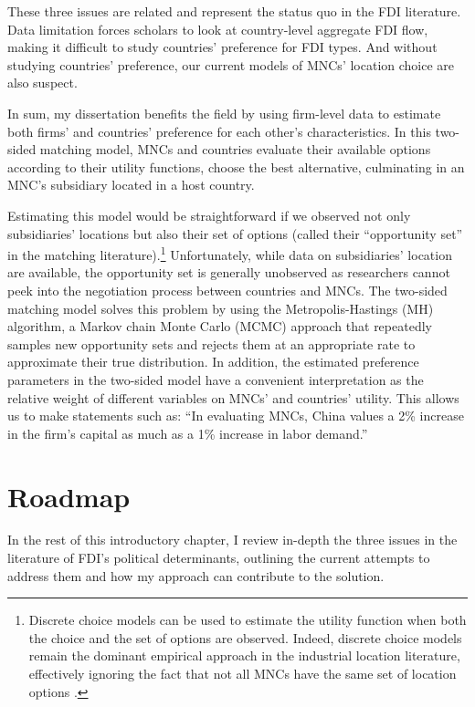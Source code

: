 These three issues are related and represent the status quo in the FDI
literature. Data limitation forces scholars to look at country-level aggregate
FDI flow, making it difficult to study countries' preference for FDI types. And
without studying countries' preference, our current models of MNCs' location
choice are also suspect.

In sum, my dissertation benefits the field by using firm-level data to estimate
both firms' and countries' preference for each other's characteristics. In this
two-sided matching model, MNCs and countries evaluate their available options
according to their utility functions, choose the best alternative, culminating
in an MNC's subsidiary located in a host country.

Estimating this model would be straightforward if we observed not only
subsidiaries' locations but also their set of options (called their
``opportunity set'' in the matching literature).\footnote{Discrete choice models
  can be used to estimate the utility function when both the choice and the set
  of options are observed. Indeed, discrete choice models remain the dominant
  empirical approach in the industrial location literature, effectively ignoring
  the fact that not all MNCs have the same set of location options
  \citep{Arauzo-Carod2010}.} Unfortunately, while data on subsidiaries' location
are available, the opportunity set is generally unobserved as researchers cannot
peek into the negotiation process between countries and MNCs. The two-sided
matching model solves this problem by using the Metropolis-Hastings (MH)
algorithm, a Markov chain Monte Carlo (MCMC) approach that repeatedly samples
new opportunity sets and rejects them at an appropriate rate to approximate
their true distribution. In addition, the estimated preference parameters in the
two-sided model have a convenient interpretation as the relative weight of
different variables on MNCs' and countries' utility. This allows us to make
statements such as: ``In evaluating MNCs, China values a 2\% increase in the
firm's capital as much as a 1\% increase in labor demand.''

\section{Roadmap}

In the rest of this introductory chapter, I review in-depth the three issues in
the literature of FDI's political determinants, outlining the current attempts
to address them and how my approach can contribute to the solution.

